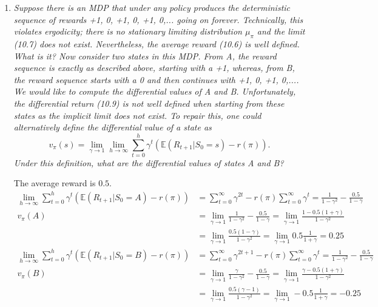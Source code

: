 \documentclass[12pt,a4paper]{article}
\begin{document}
\begin{enumerate}
  \item \textit{Suppose there is an MDP that under any policy produces the deterministic
  sequence of rewards +1, 0, +1, 0, +1, 0,... going on forever. Technically, this violates
  ergodicity; there is no stationary limiting distribution $\mu_\pi$ and the limit (10.7) does not
  exist. Nevertheless, the average reward (10.6) is well defined. What is it? Now consider
  two states in this MDP. From A, the reward sequence is exactly as described above,
  starting with a +1, whereas, from B, the reward sequence starts with a 0 and then
  continues with +1, 0, +1, 0,.... We would like to compute the differential values of A and
  B. Unfortunately, the differential return (10.9) is not well defined when starting from
  these states as the implicit limit does not exist. To repair this, one could alternatively
  define the differential value of a state as
  \[ v_\pi (s) = \lim\limits_{\gamma \rightarrow 1} \lim\limits_{h \rightarrow \infty}
  \sum\limits_{t = 0}^h \gamma^t(\mathbb{E}(R_{t + 1} | S_0 = s) - r(\pi)).
  \]
  Under this definition, what are the differential values of states A and B?}

  The average reward is $0.5$.
  \begin{align*}
    \lim\limits_{h \rightarrow \infty}
    \sum\limits_{t = 0}^h \gamma^t(\mathbb{E}(R_{t + 1} | S_0 = A) - r(\pi))
    &= \sum\limits_{t = 0}^\infty \gamma^{2t} - r(\pi) \sum\limits_{t = 0}^\infty \gamma^t
    = \frac{1}{1 - \gamma^2} - \frac{0.5}{1 - \gamma}\\
    v_\pi(A) &= \lim\limits_{\gamma \rightarrow 1} \frac{1}{1 - \gamma^2} - \frac{0.5}{1 - \gamma}
    = \lim\limits_{\gamma \rightarrow 1} \frac{1 - 0.5(1 + \gamma)}{1 - \gamma^2}\\
    &= \lim\limits_{\gamma \rightarrow 1} \frac{0.5(1 - \gamma)}{1 - \gamma^2}
    = \lim\limits_{\gamma \rightarrow 1} 0.5 \frac{1}{1 + \gamma } = 0.25\\
    \lim\limits_{h \rightarrow \infty}
    \sum\limits_{t = 0}^h \gamma^t(\mathbb{E}(R_{t + 1} | S_0 = B) - r(\pi))
    &= \sum\limits_{t = 0}^\infty \gamma^{2t + 1} - r(\pi) \sum\limits_{t = 0}^\infty \gamma^t
    = \frac{1}{1 - \gamma^2} - \frac{0.5}{1 - \gamma}\\
    v_\pi(B) &= \lim\limits_{\gamma \rightarrow 1} \frac{\gamma}{1 - \gamma^2} - \frac{0.5}{1 - \gamma}
    = \lim\limits_{\gamma \rightarrow 1} \frac{\gamma - 0.5(1 + \gamma)}{1 - \gamma^2}\\
    &= \lim\limits_{\gamma \rightarrow 1} \frac{0.5(\gamma - 1)}{1 - \gamma^2}
    = \lim\limits_{\gamma \rightarrow 1} -0.5\frac{1}{1 + \gamma} = -0.25
  \end{align*}
\end{enumerate}
\end{document}
